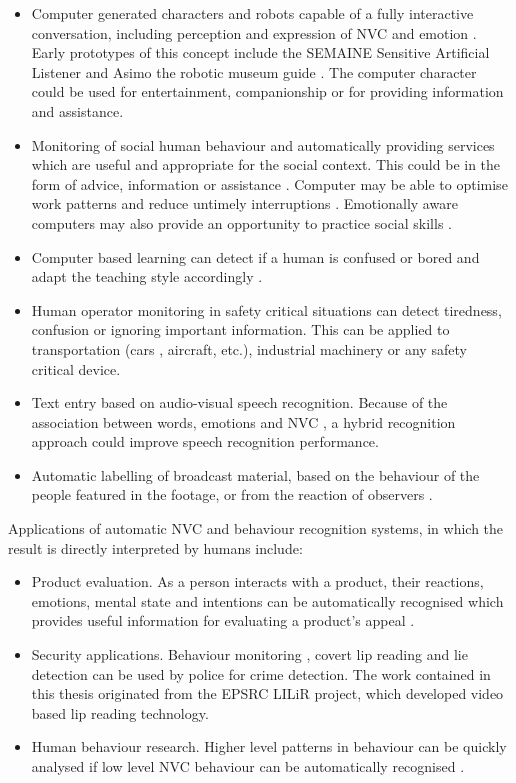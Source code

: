 \begin{itemize}
 \item Computer generated characters and robots capable of a fully interactive conversation, including perception and expression of \ac{NVC} and emotion \cite{Pantic2009}. Early prototypes of this concept include the {SEMAINE} Sensitive Artificial Listener \cite{Schroder2011} and Asimo the robotic museum guide \cite{Asimo2013}. The computer character could be used for entertainment, companionship or for providing information and assistance.
 \item Monitoring of social human behaviour and automatically providing services which are useful and appropriate for the social context. This could be in the form of advice, information or assistance \cite{Liao2006}. Computer may be able to optimise work patterns and reduce untimely interruptions \cite{Horvitz2003}. Emotionally aware computers may also provide an opportunity to practice social skills \cite{Hopkins2011}.
 \item Computer based learning can detect if a human is confused or bored and adapt the teaching style accordingly \cite{DMello2007}.
 \item Human operator monitoring in safety critical situations can detect tiredness, confusion or ignoring important information. This can be applied to transportation (cars \cite{Ji2004}, aircraft, etc.), industrial machinery or any safety critical device.
 \item Text entry based on audio-visual speech recognition. Because of the association between words, emotions and \ac{NVC} \cite{Cowie1999, Jones99}, a hybrid recognition approach could improve speech recognition performance.
 \item Automatic labelling of broadcast material, based on the behaviour of the people featured in the footage, or from the reaction of observers \cite{Pantic2009b}.
\end{itemize}

Applications of automatic \ac{NVC} and behaviour recognition systems, in which the result is directly interpreted by humans include:

\begin{itemize}
 \item Product evaluation. As a person interacts with a product, their reactions, emotions, mental state and intentions can be automatically recognised which provides useful information for evaluating a product's appeal \cite{Mano1993}.
 \item Security applications. Behaviour monitoring \cite{Pfister2011}, covert lip reading \cite{Ong2011} and lie detection can be used by police for crime detection. The work contained in this thesis originated from the EPSRC LILiR project, which developed video based lip reading technology.
 \item Human behaviour research. Higher level patterns in behaviour can be quickly analysed if low level \ac{NVC} behaviour can be automatically recognised \cite{Okwechime2011}.
\end{itemize}

